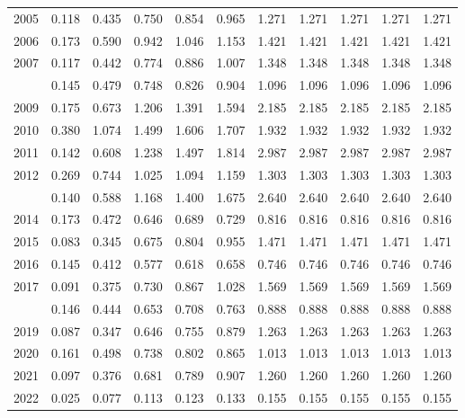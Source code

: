 \documentclass[
]{article}
\begin{document}
\begin{longtable}[t]{lrrrrrrrrrr}
2005 & 0.118 & 0.435 & 0.750 & 0.854 & 0.965 & 1.271 & 1.271 & 1.271 & 1.271 & 1.271\\
2006 & 0.173 & 0.590 & 0.942 & 1.046 & 1.153 & 1.421 & 1.421 & 1.421 & 1.421 & 1.421\\
2007 & 0.117 & 0.442 & 0.774 & 0.886 & 1.007 & 1.348 & 1.348 & 1.348 & 1.348 & 1.348\\
\addlinespace
2008 & 0.145 & 0.479 & 0.748 & 0.826 & 0.904 & 1.096 & 1.096 & 1.096 & 1.096 & 1.096\\
2009 & 0.175 & 0.673 & 1.206 & 1.391 & 1.594 & 2.185 & 2.185 & 2.185 & 2.185 & 2.185\\
2010 & 0.380 & 1.074 & 1.499 & 1.606 & 1.707 & 1.932 & 1.932 & 1.932 & 1.932 & 1.932\\
2011 & 0.142 & 0.608 & 1.238 & 1.497 & 1.814 & 2.987 & 2.987 & 2.987 & 2.987 & 2.987\\
2012 & 0.269 & 0.744 & 1.025 & 1.094 & 1.159 & 1.303 & 1.303 & 1.303 & 1.303 & 1.303\\
\addlinespace
2013 & 0.140 & 0.588 & 1.168 & 1.400 & 1.675 & 2.640 & 2.640 & 2.640 & 2.640 & 2.640\\
2014 & 0.173 & 0.472 & 0.646 & 0.689 & 0.729 & 0.816 & 0.816 & 0.816 & 0.816 & 0.816\\
2015 & 0.083 & 0.345 & 0.675 & 0.804 & 0.955 & 1.471 & 1.471 & 1.471 & 1.471 & 1.471\\
2016 & 0.145 & 0.412 & 0.577 & 0.618 & 0.658 & 0.746 & 0.746 & 0.746 & 0.746 & 0.746\\
2017 & 0.091 & 0.375 & 0.730 & 0.867 & 1.028 & 1.569 & 1.569 & 1.569 & 1.569 & 1.569\\
\addlinespace
2018 & 0.146 & 0.444 & 0.653 & 0.708 & 0.763 & 0.888 & 0.888 & 0.888 & 0.888 & 0.888\\
2019 & 0.087 & 0.347 & 0.646 & 0.755 & 0.879 & 1.263 & 1.263 & 1.263 & 1.263 & 1.263\\
2020 & 0.161 & 0.498 & 0.738 & 0.802 & 0.865 & 1.013 & 1.013 & 1.013 & 1.013 & 1.013\\
2021 & 0.097 & 0.376 & 0.681 & 0.789 & 0.907 & 1.260 & 1.260 & 1.260 & 1.260 & 1.260\\
2022 & 0.025 & 0.077 & 0.113 & 0.123 & 0.133 & 0.155 & 0.155 & 0.155 & 0.155 & 0.155\\*
\end{longtable}
\end{document}
